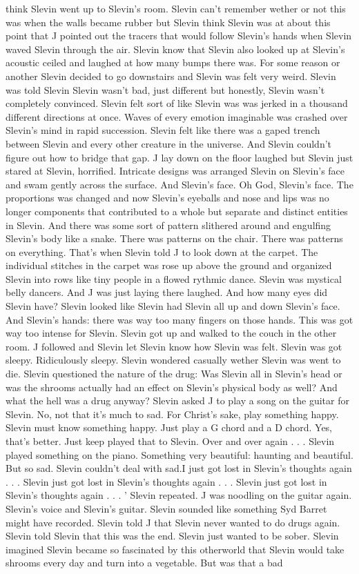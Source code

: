 \documentclass[12pt]{book}
\begin{document}
think Slevin went up to Slevin's room. Slevin can't remember wether or not this was when the walls became rubber but Slevin think Slevin was at about this point that J pointed out the tracers that would follow Slevin's hands when Slevin waved Slevin through the air. Slevin know that Slevin also looked up at Slevin's acoustic ceiled and laughed at how many bumps there was. For some reason or another Slevin decided to go downstairs and Slevin was felt very weird. Slevin was told Slevin Slevin wasn't bad, just different but honestly, Slevin wasn't completely convinced. Slevin felt sort of like Slevin was was jerked in a thousand different directions at once. Waves of every emotion imaginable was crashed over Slevin's mind in rapid succession. Slevin felt like there was a gaped trench between Slevin and every other creature in the universe. And Slevin couldn't figure out how to bridge that gap. J lay down on the floor laughed but Slevin just stared at Slevin, horrified. Intricate designs was arranged Slevin on Slevin's face and swam gently across the surface. And Slevin's face. Oh God, Slevin's face. The proportions was changed and now Slevin's eyeballs and nose and lips was no longer components that contributed to a whole but separate and distinct entities in Slevin. And there was some sort of pattern slithered around and engulfing Slevin's body like a snake. There was patterns on the chair. There was patterns on everything. That's when Slevin told J to look down at the carpet. The individual stitches in the carpet was rose up above the ground and organized Slevin into rows like tiny people in a flowed rythmic dance. Slevin was mystical belly dancers. And J was just laying there laughed. And how many eyes did Slevin have? Slevin looked like Slevin had Slevin all up and down Slevin's face. And Slevin's hands: there was way too many fingers on those hands. This was got way too intense for Slevin. Slevin got up and walked to the couch in the other room. J followed and Slevin let Slevin know how Slevin was felt. Slevin was got sleepy. Ridiculously sleepy. Slevin wondered casually wether Slevin was went to die. Slevin questioned the nature of the drug: Was Slevin all in Slevin's head or was the shrooms actually had an effect on Slevin's physical body as well? And what the hell was a drug anyway? Slevin asked J to play a song on the guitar for Slevin. No, not that it's much to sad. For Christ's sake, play something happy. Slevin must know something happy. Just play a G chord and a D chord. Yes, that's better. Just keep played that to Slevin. Over and over again . . .  Slevin played something on the piano. Something very beautiful: haunting and beautiful. But so sad. Slevin couldn't deal with sad.I just got lost in Slevin's thoughts again . . .  Slevin just got lost in Slevin's thoughts again . . .  Slevin just got lost in Slevin's thoughts again . . .  ' Slevin repeated. J was noodling on the guitar again. Slevin's voice and Slevin's guitar. Slevin sounded like something Syd Barret might have recorded. Slevin told J that Slevin never wanted to do drugs again. Slevin told Slevin that this was the end. Slevin just wanted to be sober. Slevin imagined Slevin became so fascinated by this otherworld that Slevin would take shrooms every day and turn into a vegetable. But was that a bad 
\end{document}
